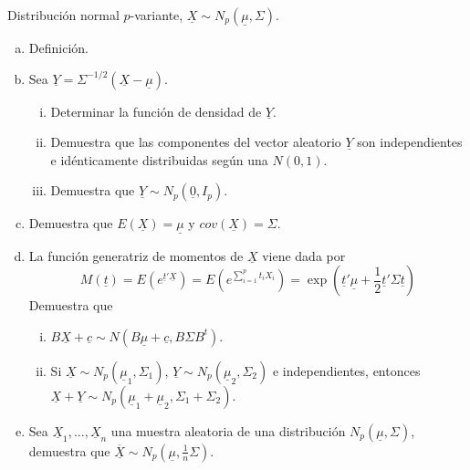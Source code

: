 \documentclass[twoside]{article}
\newcommand{\media}[1]{{\overline{#1}}}
\newcommand{\muestra}[1]{{\underline{#1}}}
\newcommand{\m}[1]{{\muestra{#1}}}
\newcommand{\mX}{{\muestra{X}}}
\begin{document}
\newpage

\begin{ejercicio}{1.2}
Distribución normal $p$-variante, $\mX \sim N_p(\m{μ},Σ)$.
\begin{enumerate}[(a)]
\item Definición.
\item Sea $\m{Y} = Σ^{-1/2}(\mX - \m{μ})$.
\begin{enumerate}[i.]
  \item Determinar la función de densidad de $\m{Y}$.
  \item Demuestra que las componentes del vector aleatorio $\m{Y}$ son independientes e idénticamente distribuidas según una $N(0,1)$.
  \item Demuestra que $\m{Y} \sim N_p(\m{0},I_p)$.
\end{enumerate}
\item Demuestra que $E(\mX) = \m{μ}$ y $cov(\m{X}) = Σ$.
\item La función generatriz de momentos de $\m{X}$ viene dada por
\[ M(\m{t}) = E\left(e^{\m{t}'\mX}\right) = E\left(e^{\sum_{i=1}^p t_i X_i}\right) = \exp\left(\m{t}'\m{μ} + \frac{1}{2}\m{t}'Σ\m{t}\right)\]
Demuestra que
\begin{enumerate}[i.]
\item $B \mX + \m{c} \sim N(B \m{μ} + \m{c}, B Σ B^t)$.
\item Si $\mX \sim N_p(\m{μ}_1,Σ_1)$, $\m{Y} \sim N_p(\m{μ}_2,Σ_2)$ e independientes, entonces $\mX+\m{Y} \sim N_p(\m{μ}_1+\m{μ}_2, Σ_1+Σ_2)$.
\end{enumerate}
\item Sea $\mX_1,\dots,\mX_n$ una muestra aleatoria de una distribución $N_p(\m{μ},Σ)$, demuestra que $\media{\m{X}} \sim N_p(\m{μ}, \frac{1}{n}Σ)$.
\end{enumerate}
\end{ejercicio}
\end{document}
